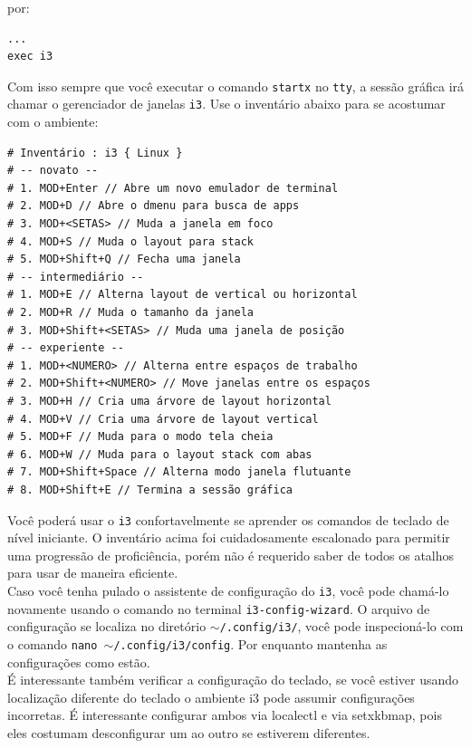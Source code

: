 \documentclass[12pt,a4paper]{article}
\begin{document}
por:

\begin{lstlisting}
...
exec i3
\end{lstlisting}

Com isso sempre que você executar o comando \texttt{startx} no \texttt{tty}, a sessão gráfica irá chamar o gerenciador de janelas \texttt{i3}. Use o inventário abaixo para se acostumar com o ambiente: \\

\begin{lstlisting}
# Inventário : i3 { Linux }
# -- novato --
# 1. MOD+Enter // Abre um novo emulador de terminal
# 2. MOD+D // Abre o dmenu para busca de apps
# 3. MOD+<SETAS> // Muda a janela em foco
# 4. MOD+S // Muda o layout para stack
# 5. MOD+Shift+Q // Fecha uma janela
# -- intermediário -- 
# 1. MOD+E // Alterna layout de vertical ou horizontal
# 2. MOD+R // Muda o tamanho da janela
# 3. MOD+Shift+<SETAS> // Muda uma janela de posição
# -- experiente -- 
# 1. MOD+<NUMERO> // Alterna entre espaços de trabalho
# 2. MOD+Shift+<NUMERO> // Move janelas entre os espaços
# 3. MOD+H // Cria uma árvore de layout horizontal
# 4. MOD+V // Cria uma árvore de layout vertical
# 5. MOD+F // Muda para o modo tela cheia
# 6. MOD+W // Muda para o layout stack com abas
# 7. MOD+Shift+Space // Alterna modo janela flutuante
# 8. MOD+Shift+E // Termina a sessão gráfica
\end{lstlisting}

\vspace{\baselineskip}

Você poderá usar o \texttt{i3} confortavelmente se aprender os comandos de teclado de nível iniciante. O inventário acima foi cuidadosamente escalonado para permitir uma progressão de proficiência, porém não é requerido saber de todos os atalhos para usar de maneira eficiente.\\

Caso você tenha pulado o assistente de configuração do \texttt{i3}, você pode chamá-lo novamente usando o comando no terminal \texttt{i3-config-wizard}. O arquivo de configuração se localiza no diretório \texttt{$\sim$/.config/i3/}, você pode inspecioná-lo com o comando \texttt{nano $\sim$/.config/i3/config}. Por enquanto mantenha as configurações como estão. \\

É interessante também verificar a configuração do teclado, se você estiver usando localização diferente do teclado o ambiente i3 pode assumir configurações incorretas. É interessante configurar ambos via localectl e via setxkbmap, pois eles costumam desconfigurar um ao outro se estiverem diferentes. \\
\end{document}
